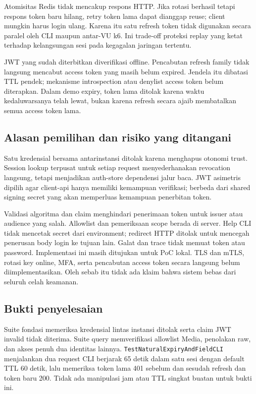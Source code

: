 Atomisitas Redis tidak mencakup respons HTTP. Jika rotasi berhasil tetapi respons token baru hilang, retry token lama dapat dianggap reuse; client mungkin harus login ulang. Karena itu satu refresh token tidak digunakan secara paralel oleh CLI maupun antar-VU k6. Ini trade-off proteksi replay yang ketat terhadap kelangsungan sesi pada kegagalan jaringan tertentu.

JWT yang sudah diterbitkan diverifikasi offline. Pencabutan refresh family tidak langsung mencabut access token yang masih belum expired. Jendela itu dibatasi TTL pendek; mekanisme introspection atau denylist access token belum diterapkan. Dalam demo expiry, token lama ditolak karena waktu kedaluwarsanya telah lewat, bukan karena refresh secara ajaib membatalkan semua access token lama.

\subsection{Alasan pemilihan dan risiko yang ditangani}
Satu kredensial bersama antarinstansi ditolak karena menghapus otonomi trust. Session lookup terpusat untuk setiap request menyederhanakan revocation langsung, tetapi menjadikan auth-store dependensi jalur baca. JWT asimetris dipilih agar client-api hanya memiliki kemampuan verifikasi; berbeda dari shared signing secret yang akan memperluas kemampuan penerbitan token.

Validasi algoritma dan claim menghindari penerimaan token untuk issuer atau audience yang salah. Allowlist dan pemeriksaan scope berada di server. Help CLI tidak mencetak secret dari environment; redirect HTTP ditolak untuk mencegah penerusan body login ke tujuan lain. Galat dan trace tidak memuat token atau password. Implementasi ini masih ditujukan untuk PoC lokal. TLS dan mTLS, rotasi key online, MFA, serta pencabutan access token secara langsung belum diimplementasikan. Oleh sebab itu tidak ada klaim bahwa sistem bebas dari seluruh celah keamanan.

\subsection{Bukti penyelesaian}
Suite fondasi memeriksa kredensial lintas instansi ditolak serta claim JWT invalid tidak diterima. Suite query memverifikasi allowlist Media, penolakan raw, dan akses penuh dua identitas lainnya. \texttt{TestNaturalExpiryAndFieldCLI} menjalankan dua request CLI berjarak 65 detik dalam satu sesi dengan default TTL 60 detik, lalu memeriksa token lama 401 sebelum dan sesudah refresh dan token baru 200. Tidak ada manipulasi jam atau TTL singkat buatan untuk bukti ini.

